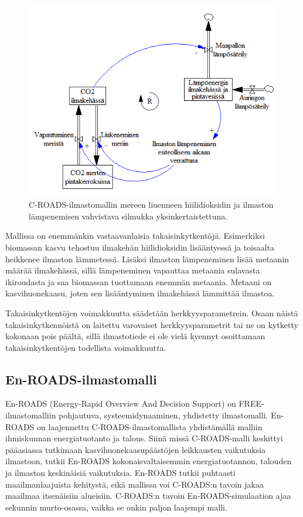 \documentclass[finnish,12pt,a4paper,pdftex]{article}
\begin{document}
\begin{onehalfspacing}
\begin{figure}[ht]
\centering \includegraphics[width=\textwidth]{c-roads-co2-lampo}
\caption{C-ROADS-ilmastomallin mereen liuenneen hiilidioksidin ja ilmaston lämpenemisen vahvistava silmukka yksinkertaistettuna. \cite{Croads} \label{ilmasto:co2-lampo}}
\end{figure}

Mallissa on enemmänkin vastaavanlaisia takaisinkytkentöjä. Esimerkiksi biomassan kasvu tehostuu ilmakehän hiilidioksidin lisääntyessä ja toisaalta heikkenee ilmaston lämmetessä. Lisäksi ilmaston lämpeneminen lisää metaanin määrää ilmakehässä, sillä lämpeneminen vapauttaa metaania sulavasta ikiroudasta ja saa biomassan tuottamaan enemmän metaania. Metaani on kasvihuonekaasu, joten sen lisääntyminen ilmakehässä lämmittää ilmastoa. \cite{CroadsFlightSimulator2011}

Takaisinkytkentöjen voimakkuutta säädetään herkkyysparametrein. Osaan näistä takaisinkytkennöistä on laitettu varovaiset herkkyysparametrit tai ne on kytketty kokonaan pois päältä, sillä ilmastotiede ei ole vielä kyennyt osoittamaan takaisinkytkentöjen todellista voimakkuutta. \cite{CroadsFlightSimulator2011}

\subsection{En-ROADS-ilmastomalli \label{ilmasto:enroads}}

En-ROADS (Energy-Rapid Overview And Decision Support) on FREE-ilmastomalliin pohjautuva, systeemidynaaminen, yhdistetty ilmastomalli. En-ROADS on laajennettu C-ROADS-ilmastomallista yhdistämällä malliin ihmiskunnan energiatuotanto ja talous. Siinä missä C-ROADS-malli keskittyi pääasiassa tutkimaan kasvihuonekaasupäästöjen leikkausten vaikutuksia ilmastoon, tutkii En-ROADS kokonaisvaltaisemmin energiatuotannon, talouden ja ilmaston keskinäisiä vaikutuksia. En-ROADS tutkii puhtaasti maailmanlaajuista kehitystä, eikä mallissa voi C-ROADS:n tavoin jakaa maailmaa itsenäisiin alueisiin. C-ROADS:n tavoin En-ROADS-simulaation ajaa sekunnin murto-osassa, vaikka se onkin paljon laajempi malli. \cite{EnroadsWWW, Harvey2013, Enroads} 


\end{onehalfspacing}
\end{document}
